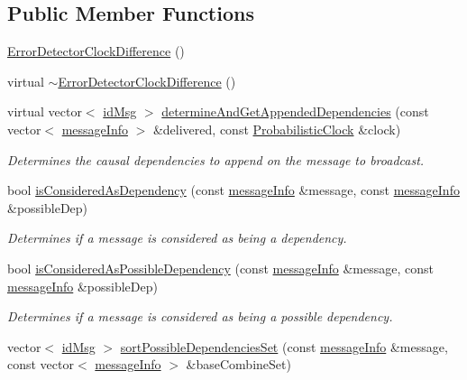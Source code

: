 \subsection*{Public Member Functions}
\begin{DoxyCompactItemize}
\item 
\hyperlink{class_error_detector_clock_difference_a5edb355be9179cd604d3e7f946846c55}{Error\+Detector\+Clock\+Difference} ()
\item 
virtual \hyperlink{class_error_detector_clock_difference_a19bda307bcb9a8974a97fdf56fb77b8f}{$\sim$\+Error\+Detector\+Clock\+Difference} ()
\item 
virtual vector$<$ \hyperlink{structures_8h_a83a1d9a070efa5341da84cfd8e28d3e5}{id\+Msg} $>$ \hyperlink{class_error_detector_clock_difference_a15406c8d7652f3b9358b1958d3723933}{determine\+And\+Get\+Appended\+Dependencies} (const vector$<$ \hyperlink{structures_8h_a7e7bdc1d2fff8a9436f2f352b2711ed6}{message\+Info} $>$ \&delivered, const \hyperlink{class_probabilistic_clock}{Probabilistic\+Clock} \&clock)
\begin{DoxyCompactList}\small\item\em Determines the causal dependencies to append on the message to broadcast. \end{DoxyCompactList}\item 
bool \hyperlink{class_error_detector_clock_difference_a4d399849b1872d3273fa757ee9dc9bd9}{is\+Considered\+As\+Dependency} (const \hyperlink{structures_8h_a7e7bdc1d2fff8a9436f2f352b2711ed6}{message\+Info} \&message, const \hyperlink{structures_8h_a7e7bdc1d2fff8a9436f2f352b2711ed6}{message\+Info} \&possible\+Dep)
\begin{DoxyCompactList}\small\item\em Determines if a message is considered as being a dependency. \end{DoxyCompactList}\item 
bool \hyperlink{class_error_detector_clock_difference_ab20aa1671eb558dea6f06b2440e97e41}{is\+Considered\+As\+Possible\+Dependency} (const \hyperlink{structures_8h_a7e7bdc1d2fff8a9436f2f352b2711ed6}{message\+Info} \&message, const \hyperlink{structures_8h_a7e7bdc1d2fff8a9436f2f352b2711ed6}{message\+Info} \&possible\+Dep)
\begin{DoxyCompactList}\small\item\em Determines if a message is considered as being a possible dependency. \end{DoxyCompactList}\item 
vector$<$ \hyperlink{structures_8h_a83a1d9a070efa5341da84cfd8e28d3e5}{id\+Msg} $>$ \hyperlink{class_error_detector_clock_difference_a6dafc330591db83f5c5fbee56b2c4937}{sort\+Possible\+Dependencies\+Set} (const \hyperlink{structures_8h_a7e7bdc1d2fff8a9436f2f352b2711ed6}{message\+Info} \&message, const vector$<$ \hyperlink{structures_8h_a7e7bdc1d2fff8a9436f2f352b2711ed6}{message\+Info} $>$ \&base\+Combine\+Set)

\end{DoxyCompactItemize}
